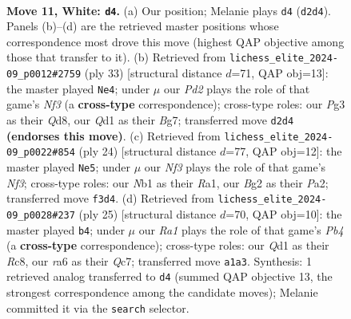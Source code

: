 \documentclass[11pt]{article}
\begin{document}
\clearpage

\begin{figure}[p]\centering
\begin{subfigure}{0.46\textwidth}\centering
\resizebox{\linewidth}{!}{%
\newchessgame
\chessboard[
  setfen={1nbq1rk1/1p2bp1p/r4np1/p1pp4/P7/1P2PNP1/3P1PBP/RNBQ1RK1 w - - 1 11},
  showmover=false,
  pgfstyle=straightmove, color=movearrow, markmove={d2-d4}
]}
\caption{}
\end{subfigure}\hfill
\begin{subfigure}{0.46\textwidth}\centering
\resizebox{\linewidth}{!}{%
\newchessgame
\chessboard[
  setfen={r2q1rk1/pp2npbp/4pnp1/1PPp4/3P4/4BN1P/P3BPP1/2RQ1RK1 b - - 0 17},
  showmover=false,
  pgfstyle=straightmove, color=movearrow, markmove={f6-e4}
]}
\caption{}
\end{subfigure}
\\[4pt]
\begin{subfigure}{0.46\textwidth}\centering
\resizebox{\linewidth}{!}{%
\newchessgame
\chessboard[
  setfen={r1bq1rk1/1p2ppbp/2n2np1/3p4/3P1B2/pPN2NP1/P3PPBP/R2Q1RK1 w - - 2 13},
  showmover=false,
  pgfstyle=straightmove, color=movearrow, markmove={f3-e5}
]}
\caption{}
\end{subfigure}\hfill
\begin{subfigure}{0.46\textwidth}\centering
\resizebox{\linewidth}{!}{%
\newchessgame
\chessboard[
  setfen={2r2rk1/p1q1ppbp/2np1np1/1pp5/4P3/2PPBNPP/PP1Q1PB1/R3R1K1 b - - 1 13},
  showmover=false,
  pgfstyle=straightmove, color=movearrow, markmove={b5-b4}
]}
\caption{}
\end{subfigure}
\caption{\textbf{Move 11, White: \texttt{d4}.} (a) Our position; Melanie plays \texttt{d4} (\texttt{d2d4}). Panels (b)--(d) are the retrieved master positions whose correspondence most drove this move (highest QAP objective among those that transfer to it). (b) Retrieved from \texttt{lichess\_elite\_2024-09\_p0012\#2759} (ply 33) [structural distance $d$=71, QAP obj=13]: the master played \texttt{Ne4}; under $\mu$ our \emph{Pd2} plays the role of that game's \emph{Nf3} (a \textbf{cross-type} correspondence); cross-type roles: our \emph{P}g3 as their \emph{Q}d8, our \emph{Q}d1 as their \emph{B}g7; transferred move \texttt{d2d4} \textbf{(endorses this move)}. (c) Retrieved from \texttt{lichess\_elite\_2024-09\_p0022\#854} (ply 24) [structural distance $d$=77, QAP obj=12]: the master played \texttt{Ne5}; under $\mu$ our \emph{Nf3} plays the role of that game's \emph{Nf3}; cross-type roles: our \emph{N}b1 as their \emph{R}a1, our \emph{B}g2 as their \emph{P}a2; transferred move \texttt{f3d4}. (d) Retrieved from \texttt{lichess\_elite\_2024-09\_p0028\#237} (ply 25) [structural distance $d$=70, QAP obj=10]: the master played \texttt{b4}; under $\mu$ our \emph{Ra1} plays the role of that game's \emph{Pb4} (a \textbf{cross-type} correspondence); cross-type roles: our \emph{Q}d1 as their \emph{R}c8, our \emph{r}a6 as their \emph{Q}c7; transferred move \texttt{a1a3}. Synthesis: 1 retrieved analog transferred to \texttt{d4} (summed QAP objective 13, the strongest correspondence among the candidate moves); Melanie committed it via the \texttt{search} selector.}
\label{fig:thought-m20}
\end{figure}
\end{document}
